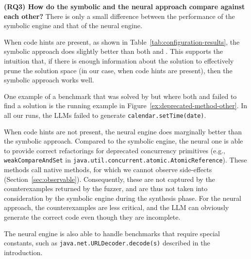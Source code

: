\documentclass[sigconf,review,anonymous]{acmart}
\begin{document}
\noindent
{\bf (RQ3) How do the symbolic and the neural approach compare against each other?}
%
There is only a small difference between the performance of the symbolic
engine and that of the neural engine.



When code hints are present, as shown in
Table~\ref{tab:configuration-results}, the symbolic approach does slightly
better than both \llma and \llmb.  This supports the intuition that, if
there is enough information about the solution to effectively prune the
solution space (in our case, when code hints are present),
%
then the symbolic approach works well. %

One example of a benchmark that was solved by \tool but where both \llma and
\llmb failed to find a solution is the running example in
Figure~\ref{ex:deprecated-method-other}.  In all our runs, the LLMs failed
to generate \lstinline[breaklines=true]{calendar.setTime(date)}.

When code hints are not present, the neural engine does mar\-gin\-al\-ly better
than the symbolic approach.
%
%
%
%
Compared to the symbolic engine, the neural one is able to provide correct
refactorings for deprecated concurrency primitives (e.g.,
\lstinline{weakCompareAndSet} in
\lstinline[breaklines=true]{java.util.concurrent.atomic.AtomicReference}). 
These methods call native methods, for which we cannot observe side-effects
(Section~\ref{sec:observable}).  Consequently, these are not captured by
the counterexamples returned by the fuzzer, and are thus not taken into
consideration by the symbolic engine during the synthesis phase.  For the
neural approach, the counterexamples are less critical, and the LLM can
obviously generate the correct code even though they are incomplete.

%
The neural engine is also able to handle benchmarks that require special
constants, such as
\lstinline[breaklines=true]{java.net.URLDecoder.decode(s)} described in the
introduction.
\end{document}
